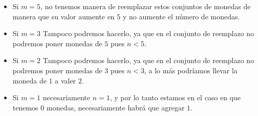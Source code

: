 \documentclass[spanish, fleqn]{article}
\DeclarePairedDelimiter{\floor}{\lfloor}{\rfloor}
\begin{document}
\begin{enumerate}
\begin{enumerate}
\begin{itemize}
\item Si $m=5$, no tenemos manera de reemplazar estos conjuntos de monedas de manera que su valor aumente en $5$ y no aumente el número de monedas.
\item Si $m=3$ Tampoco podremos hacerlo, ya que en el conjunto de reemplazo no podremos poner monedas de $5$ pues $n<5$.
\item Si $m=2$ Tampoco podremos hacerlo, ya que en el conjunto de reemplazo no podremos poner monedas de $3$ pues $n<3$, a lo más podríamos llevar la moneda de $1$ a valer $2$.
\item Si $m=1$ necesariamente $n=1$, y por lo tanto estamos en el caso en que tenemos $0$ monedas, necesariamente habrá que agregar $1$.
\end{itemize}

\end{enumerate}
\end{enumerate}
\end{document}
